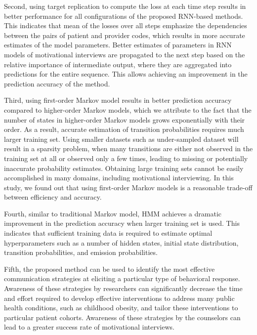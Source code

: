 \documentclass{amia_summit_2018}
\begin{document}
Second, using target replication to compute the loss at each time step results in better performance for all configurations of the proposed RNN-based methods. This indicates that mean of the losses
over all steps emphasize the dependencies between the pairs of patient and provider codes, which results in more accurate estimates of the model parameters. Better estimates of parameters in RNN
models of motivational interviews are propagated to the next step based on the relative importance of intermediate output, where they are aggregated into predictions for the entire sequence. This
allows achieving an improvement in the prediction accuracy of the method.

Third, using first-order Markov model results in better prediction accuracy compared to higher-order Markov models, which we attribute to the fact that the number of states in higher-order
Markov models grows exponentially with their order. As a result, accurate estimation of transition probabilities requires much larger training set. Using smaller datasets such as under-sampled dataset
will result in a sparsity problem, when many transitions are either not observed in the training set at all or observed only a few times, leading to missing or potentially inaccurate probability
estimates. Obtaining large training sets cannot be easily accomplished in many domains, including motivational interviewing. In this study, we found out that using first-order Markov models is a
reasonable trade-off between efficiency and accuracy.

Fourth, similar to traditional Markov model, HMM achieves a dramatic improvement in the prediction accuracy when larger training set is used. This indicates that sufficient training data is required
to estimate optimal hyperparameters such as a number of hidden states, initial state distribution, transition probabilities, and emission probabilities.   
 
Fifth, the proposed method can be used to identify the most effective communication strategies at eliciting a particular type of behavioral response. Awareness of these strategies by researchers can significantly decrease the time and effort required to develop effective interventions to address many public health conditions, such as childhood obesity, and tailor these interventions to particular patient cohorts. Awareness of these strategies by the counselors can lead to a greater success rate of motivational interviews.     
 
\end{document}
